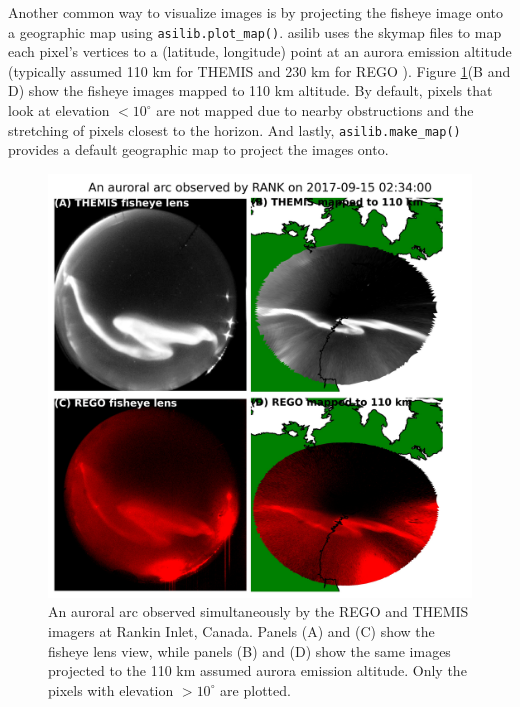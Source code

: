 \documentclass[utf8]{FrontiersinHarvard} %
\begin{document}
Another common way to visualize images is by projecting the fisheye image onto a geographic map using \verb|asilib.plot_map()|. asilib uses the skymap files to map each pixel's vertices to a (latitude, longitude) point at an aurora emission altitude (typically assumed 110 km for THEMIS and 230 km for REGO \cite{Donovan2006, Liang2016}). Figure \ref{fig2}(B and D) show the fisheye images mapped to 110 km altitude. By default, pixels that look at elevation $< 10^\circ$ are not mapped due to nearby obstructions and the stretching of pixels closest to the horizon. And lastly, \verb|asilib.make_map()| provides a default geographic map to project the images onto.

\begin{figure}
      \includegraphics[width=\textwidth]{figures/fig2.jpg}
      \caption{An auroral arc observed simultaneously by the REGO and THEMIS imagers at Rankin Inlet, Canada. Panels (A) and (C) show the fisheye lens view, while panels (B) and (D) show the same images projected to the 110 km assumed aurora emission altitude. Only the pixels with elevation $>10^\circ$ are plotted.}
      \label{fig2}
\end{figure}
\end{document}
